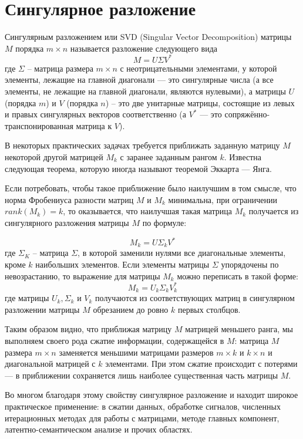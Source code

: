 \documentclass[oneside,final,14pt]{extreport} %
\begin{document}
\section{Сингулярное разложение}
Сингулярным разложением или SVD (Singular Vector Decomposition) матрицы $M$ порядка $m \times n$ называется разложение следующего вида
$$M=U\Sigma V^{*}$$
где $\Sigma$ -- матрица размера $m \times n$ с неотрицательными элементами, у которой элементы, лежащие на главной диагонали — это сингулярные числа (а все элементы, не лежащие на главной диагонали, являются нулевыми), а матрицы $U$ (порядка $m$) и $V$ (порядка $n$) -- это две унитарные матрицы, состоящие из левых и правых сингулярных векторов соответственно (а $V^*$ — это сопряжённо-транспонированная матрица к $V$).


В некоторых практических задачах требуется приближать заданную матрицу $M$ некоторой другой матрицей $M_{k}$ с заранее заданным рангом $k$. Известна следующая теорема, которую иногда называют теоремой Эккарта — Янга.

Если потребовать, чтобы такое приближение было наилучшим в том смысле, что норма Фробениуса разности матриц $M$ и $M_k$ минимальна, при ограничении $rank(M_k) = k$, то оказывается, что наилучшая такая матрица $M_k$ получается из сингулярного разложения матрицы $M$ по формуле:

$$ M_k = U \Sigma_kV^*$$
где $\Sigma_K$ -- матрица $\Sigma$, в которой заменили нулями все диагональные элементы, кроме $k$ наибольших элементов.
Если элементы матрицы $\Sigma$  упорядочены по невозрастанию, то выражение для матрицы $M_{k}$ можно переписать в такой форме:
$$ M_k = U_k \Sigma_kV_k^*$$
где матрицы $U_k, \Sigma _{k}$ и $V_{k}$ получаются из соответствующих матриц в сингулярном разложении матрицы $M$ обрезанием до ровно $k$ первых столбцов.

Таким образом видно, что приближая матрицу $M$ матрицей меньшего ранга, мы выполняем своего рода сжатие информации, содержащейся в $M$: матрица $M$ размера $m \times n$ заменяется меньшими матрицами размеров $m \times k$ и $k \times n$ и диагональной матрицей с $k$ элементами. При этом сжатие происходит с потерями — в приближении сохраняется лишь наиболее существенная часть матрицы $M$.

Во многом благодаря этому свойству сингулярное разложение и находит широкое практическое применение: в сжатии данных, обработке сигналов, численных итерационных методах для работы с матрицами, методе главных компонент, латентно-семантическом анализе и прочих областях.
\end{document}
